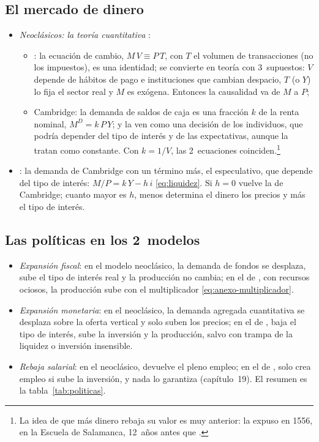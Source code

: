 \documentclass[11pt]{article}
\begin{document}
\subsection{El mercado de dinero}\label{anexo:dinero}

\begin{itemize}
\item \emph{Neoclásicos: la teoría cuantitativa} :
  \begin{itemize}
  \item {}: la ecuación de cambio, $M\,V\equiv P\,T$, con $T$ el volumen de transacciones (no los impuestos), es una identidad; se convierte en teoría con 3~supuestos: $V$ depende de hábitos de pago e instituciones que cambian despacio, $T$ (o $Y$) lo fija el sector real y $M$ es exógena. Entonces la causalidad va de $M$ a $P$\nocite{Fisher1911Purchasing};
  \item Cambridge: la demanda de saldos de caja es una fracción $k$ de la renta nominal, $M^D=k\,P\,Y$;  y \textcite{Pigou1917Value} la ven como una decisión de los individuos, que podría depender del tipo de interés y de las expectativas, aunque la tratan como constante. Con $k=1/V$, las 2~ecuaciones coinciden.\footnote{La idea de que más dinero rebaja su valor es muy anterior:  la expuso en 1556, en la Escuela de Salamanca, 12~años antes que \nocite{Azpilcueta1556Cambios,Bodin1568Reponse}.}
  \end{itemize}
\item \emph{}: la demanda de Cambridge con un término más, el especulativo, que depende del tipo de interés: $M/P=k\,Y-h\,i$ \eqref{eq:liquidez}. Si $h=0$ vuelve la de Cambridge; cuanto mayor es $h$, menos determina el dinero los precios y más el tipo de interés.
\end{itemize}

\subsection{Las políticas en los 2~modelos}\label{anexo:politicas}

\begin{itemize}
\item \emph{Expansión fiscal}: en el modelo neoclásico, la demanda de fondos se desplaza, sube el tipo de interés real y la producción no cambia; en el de , con recursos ociosos, la producción sube con el multiplicador \eqref{eq:anexo-multiplicador}.
\item \emph{Expansión monetaria}: en el neoclásico, la demanda agregada cuantitativa se desplaza sobre la oferta vertical y solo suben los precios; en el de , baja el tipo de interés, sube la inversión y la producción, salvo con trampa de la liquidez o inversión insensible.
\item \emph{Rebaja salarial}: en el neoclásico, devuelve el pleno empleo; en el de , solo crea empleo si sube la inversión, y nada lo garantiza (capítulo~19). El resumen es la tabla~\ref{tab:politicas}.
\end{itemize}
\end{document}

